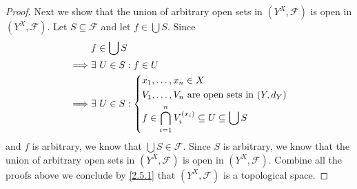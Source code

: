 \begin{proof}
  Next we show that the union of arbitrary open sets in \((Y^X, \mathcal{F})\) is open in \((Y^X, \mathcal{F})\).
  Let \(S \subseteq \mathcal{F}\) and let \(f \in \bigcup S\).
  Since
  \begin{align*}
             & f \in \bigcup S                                                                       \\
    \implies & \exists\ U \in S : f \in U                                                            \\
    \implies & \exists\ U \in S : \begin{dcases}
                                    x_1, \dots, x_n \in X                              \\
                                    V_1, \dots, V_n \text{ are open sets in } (Y, d_Y) \\
                                    f \in \bigcap_{i = 1}^n V_i^{(x_i)} \subseteq U \subseteq \bigcup S
                                  \end{dcases}
  \end{align*}
  and \(f\) is arbitrary, we know that \(\bigcup S \in \mathcal{F}\).
  Since \(S\) is arbitrary, we know that the union of arbitrary open sets in \((Y^X, \mathcal{F})\) is open in \((Y^X, \mathcal{F})\).
  Combine all the proofs above we conclude by \cref{2.5.1} that \((Y^X, \mathcal{F})\) is a topological space.


\end{proof}
